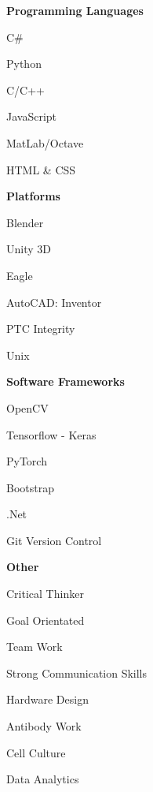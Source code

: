 \documentclass[a4paper,12pt,final]{memoir}
\newcommand{\SmallSep}{\vspace{0.5em}}
\newcommand{\CVItem}[1]
	{\textbf{\color{RoyalBlue} #1}}
\begin{document}
\CVItem{Programming Languages}
\begin{multicols}{3}
	\begin{compactitem}[\color{RoyalBlue}$\circ$]
		\item C\#
		\item Python 
		\item C/C++
		\item JavaScript
		\item MatLab/Octave
		\item HTML \& CSS
	\end{compactitem}
\end{multicols}
\SmallSep
\CVItem{Platforms}
\begin{multicols}{3}
	\begin{compactitem}[\color{RoyalBlue}$\circ$]
		\item Blender 
		\item Unity 3D
		\item Eagle
		\item AutoCAD: Inventor
		\item PTC Integrity	
		\item Unix
	\end{compactitem}
\end{multicols}
\SmallSep
\CVItem{Software Frameworks}
\begin{multicols}{3}
	\begin{compactitem}[\color{RoyalBlue}$\circ$]
		\item OpenCV 
		\item Tensorflow - Keras
		\item PyTorch
		\item Bootstrap
		\item .Net
		\item Git Version Control
	\end{compactitem}
\end{multicols}
\SmallSep
\CVItem{Other}
\begin{multicols}{3}
	\begin{compactitem}[\color{RoyalBlue}$\circ$]
		\item Critical Thinker
		\item Goal Orientated
		\item Team Work
		\item Strong Communication Skills
		\item Hardware Design 
		\item Antibody Work 
		\item Cell Culture
		\item Data Analytics
	\end{compactitem}
\end{multicols}
\end{document}
